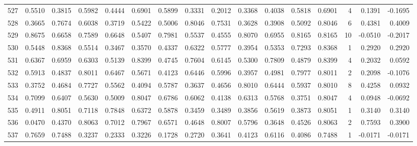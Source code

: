 \begin{tabular}{lrrrrrrrrrrrrrrr}
527 &      0.5510 &  0.3815 &  0.5982 &  0.4444 &  0.6901 &  0.5899 &  0.3331 &  0.2012 &  0.3368 &  0.4038 &   0.5818 &     0.6901 &      4 &                    0.1391 &                    -0.1695 \\
528 &      0.3665 &  0.7674 &  0.6038 &  0.3719 &  0.5422 &  0.5006 &  0.8046 &  0.7531 &  0.3628 &  0.3908 &   0.5092 &     0.8046 &      6 &                    0.4381 &                     0.4009 \\
529 &      0.8675 &  0.6658 &  0.7589 &  0.6648 &  0.5407 &  0.7981 &  0.5537 &  0.4555 &  0.8070 &  0.6955 &   0.8165 &     0.8165 &     10 &                   -0.0510 &                    -0.2017 \\
530 &      0.5448 &  0.8368 &  0.5514 &  0.3467 &  0.3570 &  0.4337 &  0.6322 &  0.5777 &  0.3954 &  0.5353 &   0.7293 &     0.8368 &      1 &                    0.2920 &                     0.2920 \\
531 &      0.6367 &  0.6959 &  0.6303 &  0.5139 &  0.8399 &  0.4745 &  0.7604 &  0.6145 &  0.5300 &  0.7809 &   0.4879 &     0.8399 &      4 &                    0.2032 &                     0.0592 \\
532 &      0.5913 &  0.4837 &  0.8011 &  0.6467 &  0.5671 &  0.4123 &  0.6446 &  0.5996 &  0.3957 &  0.4981 &   0.7977 &     0.8011 &      2 &                    0.2098 &                    -0.1076 \\
533 &      0.3752 &  0.4684 &  0.7727 &  0.5562 &  0.4094 &  0.5787 &  0.3637 &  0.4656 &  0.8010 &  0.6444 &   0.5937 &     0.8010 &      8 &                    0.4258 &                     0.0932 \\
534 &      0.7099 &  0.6407 &  0.5630 &  0.5009 &  0.8047 &  0.6786 &  0.6062 &  0.4138 &  0.6313 &  0.5768 &   0.3751 &     0.8047 &      4 &                    0.0948 &                    -0.0692 \\
535 &      0.4911 &  0.8051 &  0.7118 &  0.7848 &  0.6372 &  0.5878 &  0.3459 &  0.3489 &  0.3856 &  0.5619 &   0.3873 &     0.8051 &      1 &                    0.3140 &                     0.3140 \\
536 &      0.0470 &  0.4370 &  0.8063 &  0.7012 &  0.7967 &  0.6571 &  0.4648 &  0.8007 &  0.5796 &  0.3648 &   0.4526 &     0.8063 &      2 &                    0.7593 &                     0.3900 \\
537 &      0.7659 &  0.7488 &  0.3237 &  0.2333 &  0.3226 &  0.1728 &  0.2720 &  0.3641 &  0.4123 &  0.6116 &   0.4086 &     0.7488 &      1 &                   -0.0171 &                    -0.0171 \\

\end{tabular}
